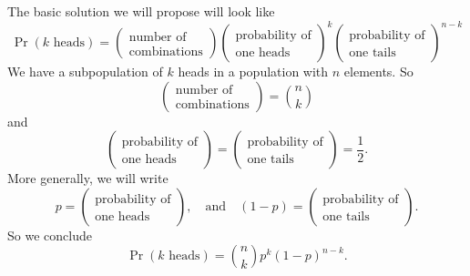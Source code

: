 The basic solution we will propose will look like
\begin{equation}
\Pr(\mbox{$k$ heads})=\begin{pmatrix}\mbox{number of}\\
\mbox{combinations}
\end{pmatrix}
\begin{pmatrix}
\mbox{probability of}\\
\mbox{one heads}
\end{pmatrix}^{k}
\begin{pmatrix}
\mbox{probability of}\\
\mbox{one tails}
\end{pmatrix}^{n-k}
\end{equation}
We have a subpopulation of $k$ heads in a population with $n$
elements. So
\begin{equation}
\begin{pmatrix}\mbox{number of}\\
\mbox{combinations}
\end{pmatrix}=\binom{n}{k}
\end{equation}
and
\begin{equation}
\begin{pmatrix}
\mbox{probability of}\\
\mbox{one heads}
\end{pmatrix}=
\begin{pmatrix}
\mbox{probability of}\\
\mbox{one tails}
\end{pmatrix}=\frac{1}{2}.
\end{equation}
More generally, we will write
\begin{equation}
p=\begin{pmatrix}
\mbox{probability of}\\
\mbox{one heads}
\end{pmatrix},\quad\mbox{and}\quad (1-p)=\begin{pmatrix}
\mbox{probability of}\\
\mbox{one tails}
\end{pmatrix}.
\end{equation}
So we conclude
\begin{equation}
\Pr(\mbox{$k$ heads})=\binom{n}{k}p^{k}(1-p)^{n-k}.
\end{equation}

